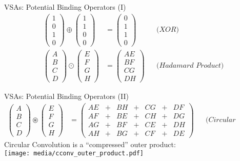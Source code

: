 \documentclass[handout,aspectratio=169]{beamer}
\newcommand{\CC}{\circledast}
\begin{document}
	\begin{frame}{VSAs: Potential Binding Operators (I)}
		\begin{align*}
		\begin{pmatrix}1 \\ 0 \\ 1 \\ 0\end{pmatrix} \oplus \begin{pmatrix}1 \\ 1 \\ 0 \\ 0\end{pmatrix} &= \begin{pmatrix}0 \\ 1 \\ 1 \\ 0\end{pmatrix} && \textit{(XOR)}\\
		\begin{pmatrix}A \\ B \\ C \\ D\end{pmatrix} \odot \begin{pmatrix}E \\ F \\ G \\ H\end{pmatrix} &= \begin{pmatrix}AE \\ BF \\ CG \\ DH\end{pmatrix} && \textit{(Hadamard Product)}
		\end{align*}
	\end{frame}

	\begin{frame}{VSAs: Potential Binding Operators (II)}
		\begin{align*}
		\begin{pmatrix}A \\ B \\ C \\ D\end{pmatrix} \CC \begin{pmatrix}E \\ F \\ G \\ H\end{pmatrix} &= \begin{pmatrix}AE &+& BH &+& CG &+& DF \\ AF &+& BE &+& CH &+& DG \\ AG &+& BF &+& CE &+& DH \\ AH &+& BG &+& CF &+& DE\end{pmatrix} && \textit{(Circular Convolution)}
		\end{align*}
		\vspace{0.25cm}
		Circular Convolution is a \enquote{compressed} outer product:\\[0.25cm]
		\hspace{0.7cm}\texttt{[image: media/cconv\_outer\_product.pdf]}
	\end{frame}
\end{document}
